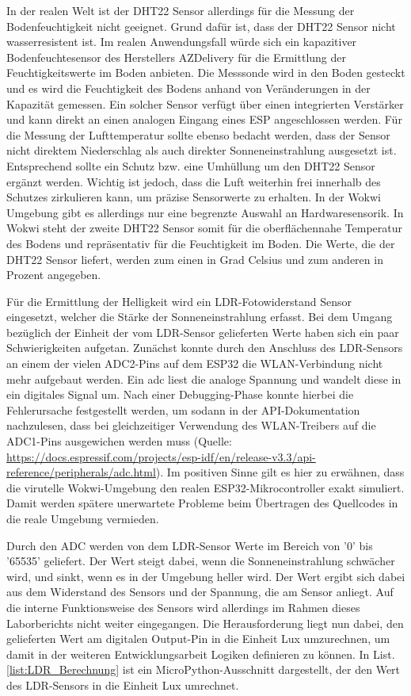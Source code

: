 In der realen Welt ist der DHT22 Sensor allerdings für die Messung der Bodenfeuchtigkeit nicht geeignet. Grund dafür ist, dass der DHT22 Sensor nicht wasserresistent ist. Im realen Anwendungsfall würde sich ein kapazitiver Bodenfeuchtesensor des Herstellers AZDelivery für die Ermittlung der Feuchtigkeitswerte im Boden anbieten. Die Messsonde wird in den Boden gesteckt und es wird die Feuchtigkeit des Bodens anhand von Veränderungen in der Kapazität gemessen. Ein solcher Sensor verfügt über einen integrierten Verstärker und kann direkt an einen analogen Eingang eines ESP angeschlossen werden. \newline
Für die Messung der Lufttemperatur sollte ebenso bedacht werden, dass der Sensor nicht direktem Niederschlag als auch direkter Sonneneinstrahlung ausgesetzt ist. Entsprechend sollte ein Schutz bzw. eine Umhüllung um den DHT22 Sensor ergänzt werden. Wichtig ist jedoch, dass die Luft weiterhin frei innerhalb des Schutzes zirkulieren kann, um präzise Sensorwerte zu erhalten.\newline
In der Wokwi Umgebung gibt es allerdings nur eine begrenzte Auswahl an Hardwaresensorik. In Wokwi steht der zweite DHT22 Sensor somit für die oberflächennahe Temperatur des Bodens und repräsentativ für die Feuchtigkeit im Boden. Die Werte, die der DHT22 Sensor liefert, werden zum einen in Grad Celsius und zum anderen in Prozent angegeben.

Für die Ermittlung der Helligkeit wird ein LDR-Fotowiderstand Sensor eingesetzt, welcher die Stärke der Sonneneinstrahlung erfasst. Bei dem Umgang bezüglich der Einheit der vom LDR-Sensor gelieferten Werte haben sich ein paar Schwierigkeiten aufgetan. 
Zunächst konnte durch den Anschluss des LDR-Sensors an einem der vielen ADC2-Pins auf dem ESP32 die WLAN-Verbindung nicht mehr aufgebaut werden. Ein \gls{adc} liest die analoge Spannung und wandelt diese in ein digitales Signal um. Nach einer Debugging-Phase konnte hierbei die Fehlerursache festgestellt werden, um sodann in der API-Dokumentation nachzulesen, dass bei gleichzeitiger Verwendung des WLAN-Treibers auf die ADC1-Pins ausgewichen werden muss (Quelle: \url{https://docs.espressif.com/projects/esp-idf/en/release-v3.3/api-reference/peripherals/adc.html}). Im positiven Sinne gilt es hier zu erwähnen, dass die virutelle Wokwi-Umgebung den realen ESP32-Mikrocontroller exakt simuliert. Damit werden spätere unerwartete Probleme beim Übertragen des Quellcodes in die reale Umgebung vermieden.

Durch den ADC werden von dem LDR-Sensor Werte im Bereich von '0' bis '65535' geliefert. Der Wert steigt dabei, wenn die Sonneneinstrahlung schwächer wird, und sinkt, wenn es in der Umgebung heller wird. Der Wert ergibt sich dabei aus dem Widerstand des Sensors und der Spannung, die am Sensor anliegt. Auf die interne Funktionsweise des Sensors wird allerdings im Rahmen dieses Laborberichts nicht weiter eingegangen. Die Herausforderung liegt nun dabei, den gelieferten Wert am digitalen Output-Pin in die Einheit Lux umzurechnen, um damit in der weiteren Entwicklungsarbeit Logiken definieren zu können. In List. \ref{list:LDR_Berechnung} ist ein MicroPython-Ausschnitt dargestellt, der den Wert des LDR-Sensors in die Einheit Lux umrechnet.


